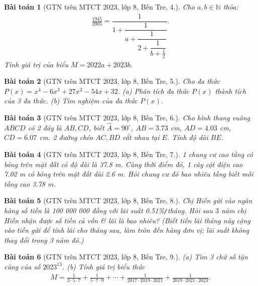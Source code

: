 \documentclass{article}
\newtheorem{baitoan}{Bài toán}
\begin{document}
\begin{baitoan}[GTN trên MTCT 2023, lớp 8, Bến Tre, 4.]
	Cho $a,b\in\mathbb{N}$ thỏa:
	\begin{align*}
		\frac{1945}{2005} = \dfrac{1}{1 + \dfrac{1}{a + \dfrac{1}{2 + \dfrac{1}{b + \frac{1}{2}}}}}.
	\end{align*}
	Tính giá trị của biểu $M = 2022a + 2023b$.
\end{baitoan}

\begin{baitoan}[GTN trên MTCT 2023, lớp 8, Bến Tre, 5.]
	Cho đa thức $P(x) = x^4 - 6x^3 + 27x^2 - 54x + 32$. (a) Phân tích đa thức $P(x)$ thành tích của 3 đa thức. (b) Tìm nghiệm của đa thức $P(x)$.
\end{baitoan}

\begin{baitoan}[GTN trên MTCT 2023, lớp 8, Bến Tre, 6.]
	Cho hình thang vuông $ABCD$ có 2 đáy là $AB,CD$, biết $\widehat{A} = 90^\circ$, $AB = 3.73$ \emph{cm}, $AD = 4.03$ \emph{cm}, $CD = 6.07$ \emph{cm}. 2 đường chéo $AC,BD$ cắt nhau tại $E$. Tính độ dài $BE$.
\end{baitoan}

\begin{baitoan}[GTN trên MTCT 2023, lớp 8, Bến Tre, 7.]
	1 chung cư cao tầng có bóng trên mặt đất có độ dài là \emph{37.8 m}. Cùng thời điểm đó, 1 cây cột điện cao \emph{7.02 m} có bóng trên mặt đất dài \emph{2.6 m}. Hỏi chung cư đó bao nhiêu tầng biết mỗi tầng cao \emph{3.78 m}.
\end{baitoan}

\begin{baitoan}[GTN trên MTCT 2023, lớp 8, Bến Tre, 8.]
	Chị Hiền gửi vào ngân hàng số tiền là \emph{100 000 000 đồng} với lãi suất \emph{0.51\%\texttt{/}tháng}. Hỏi sau $3$ năm chị Hiền nhận được số tiền cả vốn \& lãi là bao nhiêu? (Biết tiền lãi tháng này cộng vào tiền gửi để tính lãi cho tháng sau, làm tròn đến hàng đơn vị; lãi suất không thay đổi trong 3 năm đó.)
\end{baitoan}

\begin{baitoan}[GTN trên MTCT 2023, lớp 8, Bến Tre, 9.]
	(a) Tìm 3 chữ số tận cùng của số $2023^{13}$. (b) Tính giá trị biểu thức
	\begin{align*}
		M = \frac{1}{3\cdot5\cdot7} + \frac{1}{5\cdot7\cdot9} + \cdots + \frac{1}{2017\cdot2019\cdot2021} + \frac{1}{2019\cdot2021\cdot2023}.
	\end{align*}
\end{baitoan}
\end{document}
